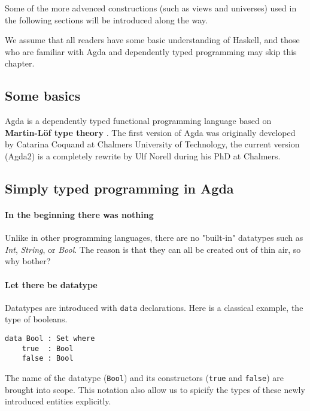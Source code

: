 \documentclass[12pt, a4paper]{article}
\begin{document}
Some of the more advenced constructions (such as views and universes) used in
the following sections will be introduced along the way.

We assume that all readers have some basic understanding of Haskell, and those
who are familiar with Agda and dependently typed programming may skip this chapter.

\subsection{Some basics}

Agda is a dependently typed functional programming language based on \textbf{Martin-Löf type theory} \cite{martin1984intuitionistic}.
The first version of Agda was originally developed by Catarina Coquand at Chalmers University of Technology, the current version (Agda2) is a completely rewrite by Ulf Norell during his PhD at Chalmers.

\subsection{Simply typed programming in Agda}


\paragraph{In the beginning there was nothing}

Unlike in other programming languages, there are no "built-in"
datatypes such as \textit{Int}, \textit{String}, or \textit{Bool}.
The reason is that they can all be created out of thin air, so why bother?

\paragraph{Let there be datatype}

Datatypes are introduced with {\lstinline|data|} declarations. Here is a classical example, the type of booleans.

\begin{lstlisting}
data Bool : Set where
    true  : Bool
    false : Bool
\end{lstlisting}

The name of the datatype ({\lstinline|Bool|}) and its constructors ({\lstinline|true|} and {\lstinline|false|}) are brought into scope.
This notation also allow us to spicify the types of these newly introduced entities explicitly.
\end{document}
